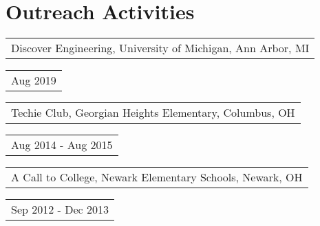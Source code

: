 \documentclass[letterpaper,10pt]{article}
\newcommand{\reitem}[2]{
  \begin{tabular}{l}
    #2
  \end{tabular}
\hfill
\begin{tabular}{r}
  #1
\end{tabular}
}
\begin{document}
\section{Outreach Activities}
\reitem{Aug 2019}{Discover Engineering, University of Michigan, Ann Arbor, MI}
\reitem{Aug 2014 - Aug 2015}{Techie Club, Georgian Heights Elementary, Columbus, OH}
\reitem{Sep 2012 - Dec 2013}{A Call to College, Newark Elementary Schools, Newark, OH}
\end{document}
